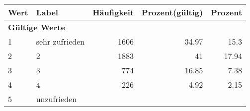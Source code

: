      \begin{longtable}{lXrrr}
     \toprule
     \textbf{Wert} & \textbf{Label} & \textbf{Häufigkeit} & \textbf{Prozent(gültig)} & \textbf{Prozent} \\
     \endhead
     \midrule
     \multicolumn{5}{l}{\textbf{Gültige Werte}}\\

     1 &
     \multicolumn{1}{X}{ sehr zufrieden   } &


       \num{1606} &
       \num[round-mode=places,round-precision=2]{34.97} &
         \num[round-mode=places,round-precision=2]{15.3} \\

     2 &
     \multicolumn{1}{X}{ 2   } &


       \num{1883} &
       \num[round-mode=places,round-precision=2]{41} &
         \num[round-mode=places,round-precision=2]{17.94} \\

     3 &
     \multicolumn{1}{X}{ 3   } &


       \num{774} &
       \num[round-mode=places,round-precision=2]{16.85} &
         \num[round-mode=places,round-precision=2]{7.38} \\

     4 &
     \multicolumn{1}{X}{ 4   } &


       \num{226} &
       \num[round-mode=places,round-precision=2]{4.92} &
         \num[round-mode=places,round-precision=2]{2.15} \\

     5 &
     \multicolumn{1}{X}{ unzufrieden   } &



\end{longtable}
